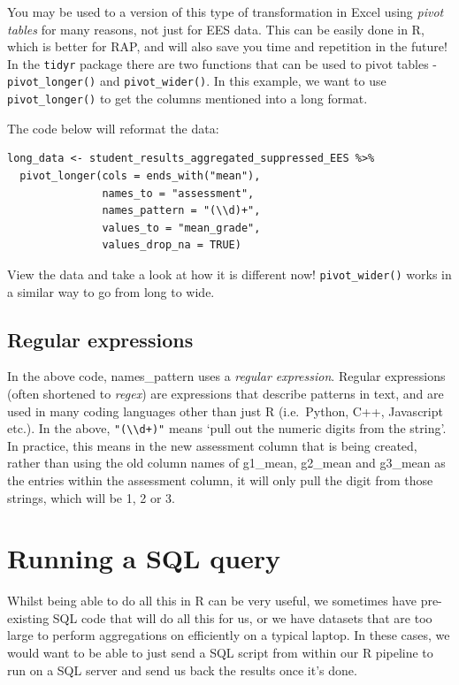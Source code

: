 \documentclass[
  12pt,
]{article}
\begin{document}
You may be used to a version of this type of transformation in Excel
using \emph{pivot tables} for many reasons, not just for EES data. This
can be easily done in R, which is better for RAP, and will also save you
time and repetition in the future! In the \texttt{tidyr} package there
are two functions that can be used to pivot tables -
\texttt{pivot\_longer()} and \texttt{pivot\_wider()}. In this example,
we want to use \texttt{pivot\_longer()} to get the columns mentioned
into a long format.

The code below will reformat the data:

\begin{verbatim}
long_data <- student_results_aggregated_suppressed_EES %>%
  pivot_longer(cols = ends_with("mean"),
               names_to = "assessment",
               names_pattern = "(\\d)+",
               values_to = "mean_grade",
               values_drop_na = TRUE)
\end{verbatim}

View the data and take a look at how it is different now!
\texttt{pivot\_wider()} works in a similar way to go from long to wide.

\hypertarget{regular-expressions}{%
\subsection{Regular expressions}\label{regular-expressions}}

In the above code, names\_pattern uses a \emph{regular expression}.
Regular expressions (often shortened to \emph{regex}) are expressions
that describe patterns in text, and are used in many coding languages
other than just R (i.e.~Python, C++, Javascript etc.). In the above,
\texttt{"(\textbackslash{}\textbackslash{}d+)"} means `pull out the
numeric digits from the string'. In practice, this means in the new
assessment column that is being created, rather than using the old
column names of g1\_mean, g2\_mean and g3\_mean as the entries within
the assessment column, it will only pull the digit from those strings,
which will be 1, 2 or 3.

\hypertarget{running-a-sql-query}{%
\section{Running a SQL query}\label{running-a-sql-query}}

Whilst being able to do all this in R can be very useful, we sometimes
have pre-existing SQL code that will do all this for us, or we have
datasets that are too large to perform aggregations on efficiently on a
typical laptop. In these cases, we would want to be able to just send a
SQL script from within our R pipeline to run on a SQL server and send us
back the results once it's done.
\end{document}
